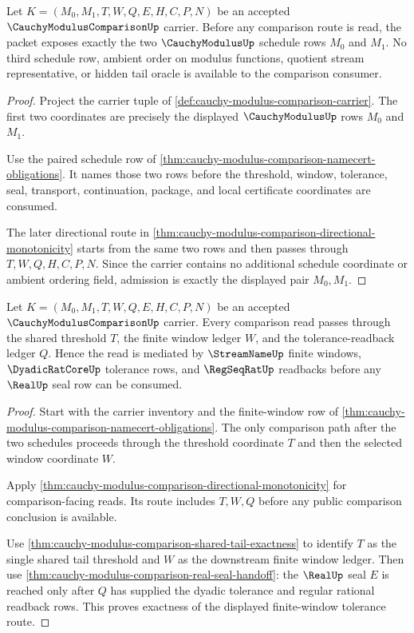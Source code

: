 \begin{theorem}
\label{thm:cauchy-modulus-comparison-paired-schedule-admission}
Let $K=(M_0,M_1,T,W,Q,E,H,C,P,N)$ be an accepted $\CauchyModulusComparisonUp$ carrier. Before any comparison route is read, the packet exposes exactly the two $\CauchyModulusUp$ schedule rows $M_0$ and $M_1$. No third schedule row, ambient order on modulus functions, quotient stream representative, or hidden tail oracle is available to the comparison consumer.
\end{theorem}
\begin{proof}
Project the carrier tuple of \autoref{def:cauchy-modulus-comparison-carrier}. The first two coordinates are precisely the displayed $\CauchyModulusUp$ rows $M_0$ and $M_1$.

Use the paired schedule row of \autoref{thm:cauchy-modulus-comparison-namecert-obligations}. It names those two rows before the threshold, window, tolerance, seal, transport, continuation, package, and local certificate coordinates are consumed.

The later directional route in \autoref{thm:cauchy-modulus-comparison-directional-monotonicity} starts from the same two rows and then passes through $T,W,Q,H,C,P,N$. Since the carrier contains no additional schedule coordinate or ambient ordering field, admission is exactly the displayed pair $M_0,M_1$.
\end{proof}

\begin{theorem}
\label{thm:cauchy-modulus-comparison-finite-window-tolerance-exactness}
Let $K=(M_0,M_1,T,W,Q,E,H,C,P,N)$ be an accepted $\CauchyModulusComparisonUp$ carrier. Every comparison read passes through the shared threshold $T$, the finite window ledger $W$, and the tolerance-readback ledger $Q$. Hence the read is mediated by $\StreamNameUp$ finite windows, $\DyadicRatCoreUp$ tolerance rows, and $\RegSeqRatUp$ readbacks before any $\RealUp$ seal row can be consumed.
\end{theorem}
\begin{proof}
Start with the carrier inventory and the finite-window row of \autoref{thm:cauchy-modulus-comparison-namecert-obligations}. The only comparison path after the two schedules proceeds through the threshold coordinate $T$ and then the selected window coordinate $W$.

Apply \autoref{thm:cauchy-modulus-comparison-directional-monotonicity} for comparison-facing reads. Its route includes $T,W,Q$ before any public comparison conclusion is available.

Use \autoref{thm:cauchy-modulus-comparison-shared-tail-exactness} to identify $T$ as the single shared tail threshold and $W$ as the downstream finite window ledger. Then use \autoref{thm:cauchy-modulus-comparison-real-seal-handoff}: the $\RealUp$ seal $E$ is reached only after $Q$ has supplied the dyadic tolerance and regular rational readback rows. This proves exactness of the displayed finite-window tolerance route.
\end{proof}

